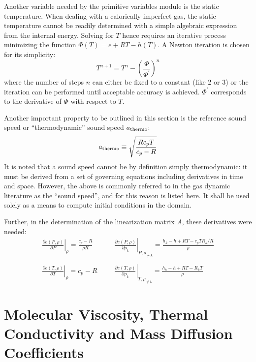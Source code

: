 \documentclass{warpdoc}
\newcommand{\cp}{{c_p}}
\newcommand{\mfd}{\displaystyle}
\begin{document}
Another variable needed by the primitive variables module is the static 
temperature. When dealing with a calorically imperfect gas, the static
temperature cannot be readily determined with a simple algebraic expression
from the internal energy. Solving for $T$ hence requires an iterative
process minimizing the function $\Phi(T)=e +  R T - h(T)$. 
A Newton iteration is chosen for its simplicity:
%
\begin{equation}
T^{n+1}=T^{n}-\left(\frac{\Phi} {\Phi^\prime}\right)^{n}
\end{equation}
%
where the number of steps $n$ can either be fixed to a constant (like 2 or 3)
or the iteration can be performed until acceptable accuracy is achieved.
$\Phi^\prime$ corresponds to the derivative of $\Phi$ with respect
to $T$.

Another important property to be outlined in this section is the
reference sound speed or ``thermodynamic'' sound speed $a_{\rm thermo}$:
%
\begin{equation}
a_{\rm thermo} \equiv \sqrt{\frac{R \cp T}{\cp - R}}
\end{equation}
%
It is noted that a sound speed cannot be by definition simply thermodynamic:
it must be derived from a set of governing equations including derivatives
in time and space. However, the above is commonly referred to in the
gas dynamic literature as the ``sound speed'', and for this reason is listed
here. It shall be used solely as a means to compute initial conditions in
the domain.

Further, in the determination of the linearization matrix $A$, these derivatives were needed:
%
\begin{equation}
\begin{array}{lll}
  \left. \mfd\frac{\partial e(P,\rho)}{\partial P} \right|_\rho=\mfd\frac{\cp-R}{\rho R}
  &~~~~&\left. \mfd\frac{\partial e(P,\rho)}{\partial \rho_k} \right|_{P,\rho_{\ne k}}
             =\mfd\frac{h_k-h+RT-\cp T R_k/R}{\rho} \\
~~&~~&~~\\
  \left. \mfd\frac{\partial e(T,\rho)}{\partial T} \right|_\rho=\cp-R
  &~~~~&  \left. \mfd\frac{\partial e(T,\rho)}{\partial \rho_k} \right|_{T,\rho_{\ne k}}
             =\mfd\frac{h_k-h+RT-R_k T}{\rho}
\end{array}
\end{equation}
%




\section{Molecular Viscosity, Thermal Conductivity and Mass Diffusion Coefficients}
\end{document}
